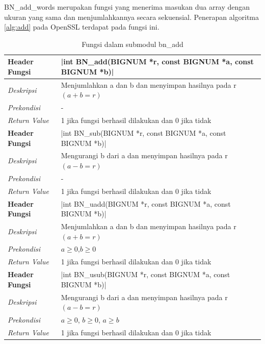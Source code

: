 BN\_add\_words merupakan fungsi yang menerima masukan dua array dengan ukuran yang sama dan menjumlahkannya secara sekuensial. Penerapan algoritma \ref{alg:add} pada OpenSSL terdapat pada fungsi ini.

\begin{table}[!h]
  \caption{Fungsi dalam submodul bn\_add}
  \label{tab:bn_add_func}
  \begin{tabular}{R{2.5cm}L{10.5cm}}
\toprule
\textbf{Header Fungsi} & |int BN_add(BIGNUM *r, const BIGNUM *a, const BIGNUM *b)|    \\ \midrule
\textit{Deskripsi}    & Menjumlahkan a dan b dan menyimpan hasilnya pada r $(a+b=r)$ \\
\textit{Prekondisi}    & - \\
\textit{Return Value}  & 1 jika fungsi berhasil dilakukan dan 0 jika tidak
 \\ \bottomrule
\textbf{Header Fungsi} & |int BN_sub(BIGNUM *r, const BIGNUM *a, const BIGNUM *b)|    \\ \midrule
\textit{Deskripsi}    & Mengurangi b dari a dan menyimpan hasilnya pada r $(a-b=r)$ \\
\textit{Prekondisi}    & - \\
\textit{Return Value}  & 1 jika fungsi berhasil dilakukan dan 0 jika tidak
 \\ \bottomrule
\textbf{Header Fungsi} & |int BN_uadd(BIGNUM *r, const BIGNUM *a, const BIGNUM *b)|    \\ \midrule
\textit{Deskripsi}    & Menjumlahkan a dan b dan menyimpan hasilnya pada r $(a+b=r)$ \\
\textit{Prekondisi}    & $a \geq 0$,$ b \geq 0$ \\
\textit{Return Value}  & 1 jika fungsi berhasil dilakukan dan 0 jika tidak
 \\ \bottomrule
\textbf{Header Fungsi} & |int BN_usub(BIGNUM *r, const BIGNUM *a, const BIGNUM *b)|    \\ \midrule
\textit{Deskripsi}    & Mengurangi b dari a dan menyimpan hasilnya pada r $(a-b=r)$ \\
\textit{Prekondisi}    & $a \geq 0$, $b \geq 0$, $a \geq b$ \\
\textit{Return Value}  & 1 jika fungsi berhasil dilakukan dan 0 jika tidak
 \\ \bottomrule
\end{tabular}

\end{table}

